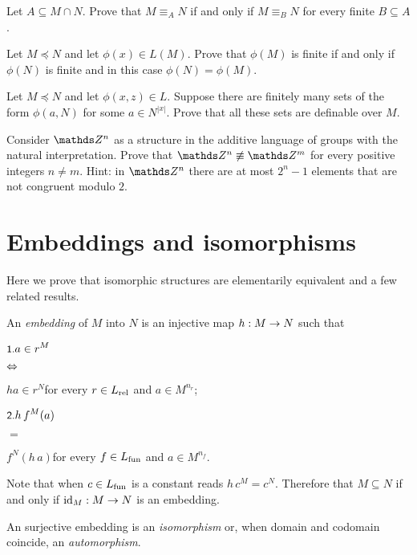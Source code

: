 \documentclass[creche.tex]{subfiles}
\begin{document}
\begin{exercise}\label{finitanaturaeqel}
Let $A\subseteq M\cap N$.
Prove that $M\equiv_A N$ if and only if $M\equiv_B N$ for every finite $B\subseteq A$.\QED
\end{exercise}

\begin{exercise}
Let $M\preceq N$ and let $\phi(x)\in L(M)$.
Prove that $\phi(M)$ is finite if and only if  $\phi(N)$ is finite and in this case $\phi(N)=\phi(M)$.\QED
\end{exercise}

\begin{exercise}
Let $M\preceq N$ and let $\phi(x,z)\in L$.
Suppose there are finitely many sets of the form $\phi(a,N)$ for some $a\in N^{|x|}$.
Prove that all these sets are definable over $M$.\QED
\end{exercise}

\begin{exercise}
Consider $\ZZ^n$ as a structure in the additive language of groups with the natural interpretation.
Prove that $\ZZ^n\not\equiv\ZZ^m$ for every positive integers $n\neq m$.
Hint: in $\ZZ^n$ there are at most $2^n-1$ elements that are not congruent modulo $2$.\QED
\end{exercise}


\section{Embeddings and isomorphisms}\label{Embeddings and isomorphisms}


\def\ceq#1#2#3{\parbox[b]{15ex}{$\displaystyle #1$}\parbox[b]{6ex}{\hfil$#2$}$\displaystyle #3$}

Here we prove that isomorphic structures are elementarily equivalent and a few related results.

\begin{definition}\label{isomorfismodef}
An \emph{embedding\/} of $M$ into $N$ is an injective map $h:M\rightarrow N$ such that

\ceq{\ssf{1.}\hfill a\in r^M}{\IFF}{ha\in r^N}\hfill for every $r\in L_{\rm rel}$ and $a\in M^{n_r}$;

\ceq{\ssf{2.}\hfill h\, f^M(a)}{=}{f^N(h\,a)}\hfill for every $f\in L_{\rm fun}$ and $a\in M^{n_f}$.

Note that when $c\in L_{\rm fun}$ is a constant  reads $h\,c^M=c^N$.
Therefore that $M\subseteq N$  if and only if $\textrm{id}_M:M\rightarrow N$ is an embedding.

An surjective embedding is an \emph{isomorphism} or, when domain and codomain coincide, an \emph{automorphism}.\QED
\end{definition}
\end{document}
